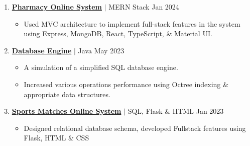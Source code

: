 \documentclass[a4paper,11pt]{article}
\begin{document}
\begin{enumerate}
    \item \href{https://github.com/advanced-computer-lab-2023/Code-of-Duty2-Pharmacy} {\textbf{\color[rgb]{0,0,1} Pharmacy Online System}} $|$ {MERN Stack} \hfill {Jan 2024}
          \begin{itemize}
              \item Used MVC architecture to implement full-stack features in the system using Express, MongoDB, React, TypeScript, \& Material UI.
          \end{itemize}

    \item \href{https://github.com/hosain-ghoraba/Simple_Database_Engine/tree/main} {\textbf{\color[rgb]{0,0,1} Database Engine}} $|$ {Java} \hfill {May 2023}
          \begin{itemize}
              \item A simulation of a simplified SQL database engine.
              \item Increased various operations performance using Octree indexing \& appropriate data structures.
          \end{itemize}
          

    \item \href{https://github.com/hosain-ghoraba/Sports-Management_Registration-DBMS} {\textbf{\color[rgb]{0,0,1} Sports Matches Online System}} $|$ {SQL, Flask \& HTML} \hfill {Jan 2023}
        \begin{itemize}
            \item Designed relational database schema, developed Fullstack features using Flask, HTML \& CSS
        \end{itemize}
        




\end{enumerate}
\end{document}
